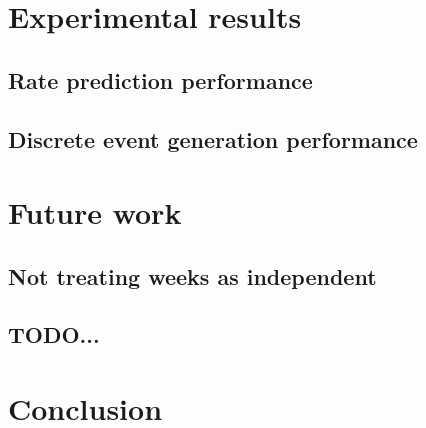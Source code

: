 \documentclass[10pt,conference,compsocconf]{IEEEtran}
\begin{document}
\section{Experimental results}

\subsection{Rate prediction performance}

\subsection{Discrete event generation performance}


\section{Future work}

\subsection{Not treating weeks as independent}

\subsection{TODO...}



\section{Conclusion}






\end{document}
